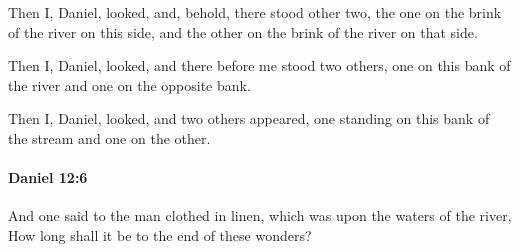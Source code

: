 			\begin{versebox}
					\item[BHS] 
					\item[LXX] 
					\item[ASV] Then I, Daniel, looked, and, behold, there stood other two, the one on the brink of the river on this side, and the other on the brink of the river on that side.
					\item[NIV] Then I, Daniel, looked, and there before me stood two others, one on this bank of the river and one on the opposite bank.
					\item[NRSV] Then I, Daniel, looked, and two others appeared, one standing on this bank of the stream and one on the other.
			\end{versebox}

		\paragraph{Daniel 12:6} %
			\label{DANIEL-12-6}

			And one said to the man clothed in linen, which was upon the waters of the river, How long shall it be to the end of these wonders?

